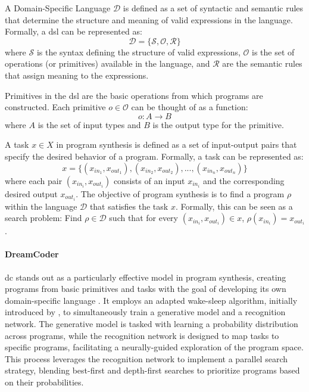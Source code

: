 A Domain-Specific Language \( \mathcal{D} \) is defined as a set of syntactic and semantic rules that determine the structure and meaning of valid expressions in the language. Formally, a \acrshort{dsl} can be represented as:
\[ \mathcal{D} = \{ \mathcal{S}, \mathcal{O}, \mathcal{R} \} \]
where \( \mathcal{S} \) is the syntax defining the structure of valid expressions, \( \mathcal{O} \) is the set of operations (or primitives) available in the language, and \( \mathcal{R} \) are the semantic rules that assign meaning to the expressions.

Primitives in the \acrshort{dsl} are the basic operations from which programs are constructed. Each primitive \( o \in \mathcal{O} \) can be thought of as a function:
\[ o: A \rightarrow B \]
where \( A \) is the set of input types and \( B \) is the output type for the primitive.

A task \( x \in X \) in program synthesis is defined as a set of input-output pairs that specify the desired behavior of a program. Formally, a task can be represented as:
\[ x = \{ (x_{in_1}, x_{out_1}), (x_{in_2}, x_{out_2}), ..., (x_{in_n}, x_{out_n}) \} \]
where each pair \( (x_{in_i}, x_{out_i}) \) consists of an input \( x_{in_i} \) and the corresponding desired output \( x_{out_i} \).
The objective of program synthesis is to find a program \( \rho \) within the language \( \mathcal{D} \) that satisfies the task \( x \). Formally, this can be seen as a search problem:
Find \( \rho \in \mathcal{D} \) such that for every \( (x_{in_i}, x_{out_i}) \in x \), \( \rho(x_{in_i}) = x_{out_i} \).

\paragraph*{DreamCoder}\label{subsubsec:dreamcoder}
\acrfull{dc} stands out as a particularly effective model in program synthesis, creating programs from basic primitives and tasks with the goal of developing its own domain-specific language \cite{ellisDreamCoderBootstrappingInductive2021}. It employs an adapted wake-sleep algorithm, initially introduced by \citet{hinton1995wake}, to simultaneously train a generative model and a recognition network. The generative model is tasked with learning a probability distribution across programs, while the recognition network is designed to map tasks to specific programs, facilitating a neurally-guided exploration of the program space. This process leverages the recognition network to implement a parallel search strategy, blending best-first and depth-first searches to prioritize programs based on their probabilities.

